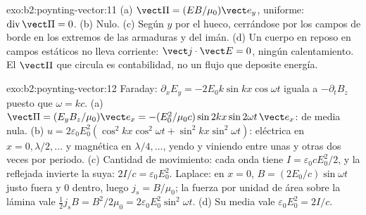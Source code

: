 \begin{solution}{exo:b2:poynting-vector:11}
(a) $\vect\Pi = (EB/\mu_0)\vect e_y$, uniforme: $\operatorname{div}\vect\Pi = 0$. (b) Nulo.
(c) Según $y$ por el hueco, cerrándose por los campos de borde en los
extremos de las armaduras y del imán. (d) Un cuerpo en reposo en campos
estáticos no lleva corriente: $\vect j\cdot\vect E = 0$, ningún
calentamiento. El $\vect\Pi$ que circula es contabilidad, no un flujo que deposite energía.
\end{solution}

\begin{solution}{exo:b2:poynting-vector:12}
Faraday: $\partial_xE_y = -2E_0k\sin kx\cos\omega t$ iguala a $-\partial_tB_z$ puesto que
$\omega = kc$. (a)
$\vect\Pi = (E_yB_z/\mu_0)\vect e_x = -(E_0^2/\mu_0c)\sin2kx\sin2\omega t\,\vect e_x$: de media
nula. (b) $u = 2\varepsilon_0E_0^2(\cos^2kx\cos^2\omega t + \sin^2kx\sin^2\omega t)$: eléctrica
en $x = 0, \lambda/2, \dots$ y magnética en $\lambda/4, \dots$, yendo y viniendo entre unas y otras
dos veces por periodo. (c) Cantidad de movimiento: cada onda tiene $I = \varepsilon_0cE_0^2/2$, y la
reflejada invierte la suya: $2I/c = \varepsilon_0E_0^2$. Laplace: en $x =
0$, $B = (2E_0/c)\sin\omega t$ justo fuera y $0$ dentro, luego $j_s = B/\mu_0$; la
fuerza por unidad de área sobre la lámina vale $\tfrac12j_sB = B^2/2\mu_0 = 2\varepsilon_0E_0^2\sin^2
\omega t$. (d) Su media vale $\varepsilon_0E_0^2 = 2I/c$.
\end{solution}

